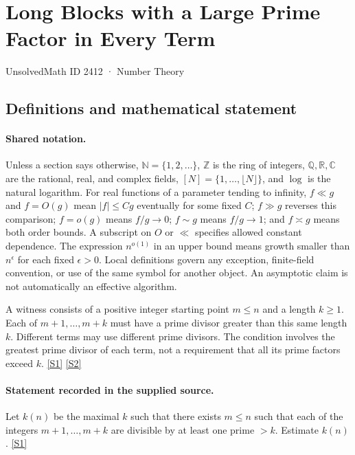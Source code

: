 \documentclass[11pt,a4paper]{article}
\newcommand{\N}{\mathbb{N}}
\newcommand{\Z}{\mathbb{Z}}
\newcommand{\Q}{\mathbb{Q}}
\newcommand{\R}{\mathbb{R}}
\newcommand{\C}{\mathbb{C}}
\newcommand{\sref}[2]{\hyperlink{source:#1:#2}{[S#2]}}
\begin{document}

\setcounter{section}{2411}

\section{Long Blocks with a Large Prime Factor in Every Term}\label{2412}

{\small\sffamily UnsolvedMath ID 2412 · Number Theory}

\subsection{Definitions and mathematical statement}

\paragraph{Shared notation.}Unless a section says otherwise, $\N=\{1,2,\ldots\}$,
$\Z$ is the ring of integers, $\Q,\R,\C$ are the rational, real, and complex
fields, $[N]=\{1,\ldots,\lfloor N\rfloor\}$, and $\log$ is the natural
logarithm. For real functions of a parameter tending to infinity,
$f\ll g$ and $f=O(g)$ mean $|f|\leq Cg$ eventually for some fixed $C$;
$f\gg g$ reverses this comparison; $f=o(g)$ means $f/g\to0$;
$f\sim g$ means $f/g\to1$; and $f\asymp g$ means both order bounds.
A subscript on $O$ or $\ll$ specifies allowed constant dependence.
The expression $n^{o(1)}$ in an upper bound means growth smaller than
$n^\epsilon$ for each fixed $\epsilon>0$. Local definitions govern any
exception, finite-field convention, or use of the same symbol for another
object. An asymptotic claim is not automatically an effective algorithm.



A witness consists of a positive integer starting point $m\leq n$ and a length $k\geq1$. Each of $m+1,\ldots,m+k$ must have a prime divisor greater than this same length $k$. Different terms may use different prime divisors. The condition involves the greatest prime divisor of each term, not a requirement that all its prime factors exceed $k$. \sref{2412}{1} \sref{2412}{2}

\paragraph{Statement recorded in the supplied source.}
Let $k(n)$ be the maximal $k$ such that there exists $m\leq n$ such that each of the integers $ m+1,\ldots,m+k $ are divisible by at least one prime $>k$. Estimate $k(n)$. \sref{2412}{1}
\end{document}
